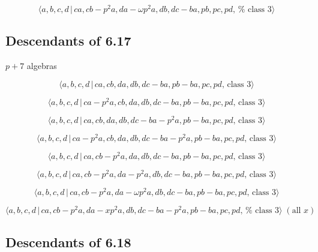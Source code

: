 \documentclass[10pt]{article}
\begin{document}
\begin{equation}
\langle a,b,c,d\,|\,ca,cb-p^{2}a,da-\omega p^{2}a,db,dc-ba,pb,pc,pd,\,\text{%
class }3\rangle  \tag{7.3719}
\end{equation}

\subsection{Descendants of 6.17}

$p+7$ algebras

\begin{equation}
\langle a,b,c,d\,|\,ca,cb,da,db,dc-ba,pb-ba,pc,pd,\,\text{class }3\rangle 
\tag{7.3720}
\end{equation}

\begin{equation}
\langle a,b,c,d\,|\,ca-p^2a,cb,da,db,dc-ba,pb-ba,pc,pd,\,\text{class }%
3\rangle  \tag{7.3721}
\end{equation}

\begin{equation}
\langle a,b,c,d\,|\,ca,cb,da,db,dc-ba-p^2a,pb-ba,pc,pd,\,\text{class }%
3\rangle  \tag{7.3722}
\end{equation}

\begin{equation}
\langle a,b,c,d\,|\,ca-p^2a,cb,da,db,dc-ba-p^2a,pb-ba,pc,pd,\,\text{class }%
3\rangle  \tag{7.3723}
\end{equation}

\begin{equation}
\langle a,b,c,d\,|\,ca,cb-p^2a,da,db,dc-ba,pb-ba,pc,pd,\,\text{class }%
3\rangle  \tag{7.3724}
\end{equation}

\begin{equation}
\langle a,b,c,d\,|\,ca,cb-p^2a,da-p^2a,db,dc-ba,pb-ba,pc,pd,\,\text{class }%
3\rangle  \tag{7.3725}
\end{equation}

\begin{equation}
\langle a,b,c,d\,|\,ca,cb-p^{2}a,da-\omega p^{2}a,db,dc-ba,pb-ba,pc,pd,\,%
\text{class }3\rangle  \tag{7.3726}
\end{equation}

\begin{equation}
\langle a,b,c,d\,|\,ca,cb-p^2a,da-xp^2a,db,dc-ba-p^2a,pb-ba,pc,pd,\,\text{%
class }3\rangle \;(\text{all }x)  \tag{7.3727}
\end{equation}

\subsection{Descendants of 6.18}
\end{document}
